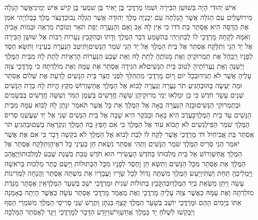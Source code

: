 \documentclass[../main/main.tex]{subfiles}
\begin{document}
\begin{multicols}{\ncols}
אִישׁ יְהוּדִי הָיָה בְּשׁוּשַׁן הַבִּירָה וּשְׁמוֹ מָרְדֳּכַי בֶּן יָאִיר בֶּן שִׁמְעִי בֶּן קִישׁ אִישׁ יְמִינִי\PreVerseSpace{}אֲשֶׁר הָגְלָה מִירוּשָׁלַיִם עִם הַגֹּלָה אֲשֶׁר הָגְלְתָה עִם יְכָנְיָה מֶלֶךְ יְהוּדָה אֲשֶׁר הֶגְלָה נְבוּכַדְנֶצֹּר מֶלֶךְ בָּבֶל\PreVerseSpace{}וַיְהִי אֹמֵן אֶת הֲדַסָּה הִיא אֶסְתֵּר בַּת דֹּדוֹ כִּי אֵין לָהּ אָב וָאֵם וְהַנַּעֲרָה יְפַת תֹּאַר וְטוֹבַת מַרְאֶה וּבְמוֹת אָבִיהָ וְאִמָּהּ לְקָחָהּ מָרְדֳּכַי לוֹ לְבַת\PreVerseSpace{}וַיְהִי בְּהִשָּׁמַע דְּבַר הַמֶּלֶךְ וְדָתוֹ וּבְהִקָּבֵץ נְעָרוֹת רַבּוֹת אֶל שׁוּשַׁן הַבִּירָה אֶל יַד הֵגָי וַתִּלָּקַח אֶסְתֵּר אֶל בֵּית הַמֶּלֶךְ אֶל יַד הֵגַי שֹׁמֵר הַנָּשִׁים\PreVerseSpace{}וַתִּיטַב הַנַּעֲרָה בְעֵינָיו וַתִּשָּׂא חֶסֶד לְפָנָיו וַיְבַהֵל אֶת תַּמְרוּקֶיהָ וְאֶת מָנוֹתֶהָ לָתֵת לָהּ וְאֵת שֶׁבַע הַנְּעָרוֹת הָרְאֻיוֹת לָתֶת לָהּ מִבֵּית הַמֶּלֶךְ וַיְשַׁנֶּהָ וְאֶת נַעֲרוֹתֶיהָ לְטוֹב בֵּית הַנָּשִׁים\PreVerseSpace{}לֹא הִגִּידָה אֶסְתֵּר אֶת עַמָּהּ וְאֶת מוֹלַדְתָּהּ כִּי מָרְדֳּכַי צִוָּה עָלֶיהָ אֲשֶׁר לֹא תַגִּיד\PreVerseSpace{}וּבְכָל יוֹם וָיוֹם מָרְדֳּכַי מִתְהַלֵּךְ לִפְנֵי חֲצַר בֵּית הַנָּשִׁים לָדַעַת אֶת שְׁלוֹם אֶסְתֵּר וּמַה יֵּעָשֶׂה בָּהּ\PreVerseSpace{}וּבְהַגִּיעַ תֹּר נַעֲרָה וְנַעֲרָה לָבוֹא אֶל הַמֶּלֶךְ אֲחַשְׁוֵרוֹשׁ מִקֵּץ הֱיוֹת לָהּ כְּדָת הַנָּשִׁים שְׁנֵים עָשָׂר חֹדֶשׁ כִּי כֵּן יִמְלְאוּ יְמֵי מְרוּקֵיהֶן שִׁשָּׁה חֳדָשִׁים בְּשֶׁמֶן הַמֹּר וְשִׁשָּׁה חֳדָשִׁים בַּבְּשָׂמִים וּבְתַמְרוּקֵי הַנָּשִׁים\PreVerseSpace{}וּבָזֶה הַנַּעֲרָה בָּאָה אֶל הַמֶּלֶךְ אֵת כָּל אֲשֶׁר תֹּאמַר יִנָּתֵן לָהּ לָבוֹא עִמָּהּ מִבֵּית הַנָּשִׁים עַד בֵּית הַמֶּלֶךְ\PreVerseSpace{}בָּעֶרֶב הִיא בָאָה וּבַבֹּקֶר הִיא שָׁבָה אֶל בֵּית הַנָּשִׁים שֵׁנִי אֶל יַד שַׁעֲשְׁגַז סְרִיס הַמֶּלֶךְ שֹׁמֵר הַפִּילַגְשִׁים לֹא תָבוֹא עוֹד אֶל הַמֶּלֶךְ כִּי אִם חָפֵץ בָּהּ הַמֶּלֶךְ וְנִקְרְאָה בְשֵׁם\PreVerseSpace{}וּבְהַגִּיעַ תֹּר אֶסְתֵּר בַּת אֲבִיחַיִל דֹּד מָרְדֳּכַי אֲשֶׁר לָקַח לוֹ לְבַת לָבוֹא אֶל הַמֶּלֶךְ לֹא בִקְשָׁה דָּבָר כִּי אִם אֶת אֲשֶׁר יֹאמַר הֵגַי סְרִיס הַמֶּלֶךְ שֹׁמֵר הַנָּשִׁים וַתְּהִי אֶסְתֵּר נֹשֵׂאת חֵן בְּעֵינֵי כָּל רֹאֶיהָ\PreVerseSpace{}וַתִּלָּקַח אֶסְתֵּר אֶל הַמֶּלֶךְ אֲחַשְׁוֵרוֹשׁ אֶל בֵּית מַלְכוּתוֹ בַּחֹדֶשׁ הָעֲשִׂירִי הוּא חֹדֶשׁ טֵבֵת בִּשְׁנַת שֶׁבַע לְמַלְכוּתוֹ\PreVerseSpace{}וַיֶּאֱהַב הַמֶּלֶךְ אֶת אֶסְתֵּר מִכָּל הַנָּשִׁים וַתִּשָּׂא חֵן וָחֶסֶד לְפָנָיו מִכָּל הַבְּתוּלוֹת וַיָּשֶׂם כֶּתֶר מַלְכוּת בְּרֹאשָׁהּ וַיַּמְלִיכֶהָ תַּחַת וַשְׁתִּי\PreVerseSpace{}וַיַּעַשׂ הַמֶּלֶךְ מִשְׁתֶּה גָדוֹל לְכָל שָׂרָיו וַעֲבָדָיו אֵת מִשְׁתֵּה אֶסְתֵּר וַהֲנָחָה לַמְּדִינוֹת עָשָׂה וַיִּתֵּן מַשְׂאֵת כְּיַד הַמֶּלֶךְ\PreVerseSpace{}וּבְהִקָּבֵץ בְּתוּלוֹת שֵׁנִית וּמָרְדֳּכַי יֹשֵׁב בְּשַׁעַר הַמֶּלֶךְ\PreVerseSpace{}אֵין אֶסְתֵּר מַגֶּדֶת מוֹלַדְתָּהּ וְאֶת עַמָּהּ כַּאֲשֶׁר צִוָּה עָלֶיהָ מָרְדֳּכָי וְאֶת מַאֲמַר מָרְדֳּכַי אֶסְתֵּר עֹשָׂה כַּאֲשֶׁר הָיְתָה בְאָמְנָה אִתּוֹ \ClosedSection{}בַּיָּמִים הָהֵם וּמָרְדֳּכַי יוֹשֵׁב בְּשַׁעַר הַמֶּלֶךְ קָצַף בִּגְתָן וָתֶרֶשׁ שְׁנֵי סָרִיסֵי הַמֶּלֶךְ מִשֹּׁמְרֵי הַסַּף וַיְבַקְשׁוּ לִשְׁלֹחַ יָד בַּמֶּלֶךְ אֲחַשְׁוֵרֹשׁ\PreVerseSpace{}וַיִּוָּדַע הַדָּבָר לְמָרְדֳּכַי וַיַּגֵּד לְאֶסְתֵּר הַמַּלְכָּה 
\end{multicols}
\end{document}
